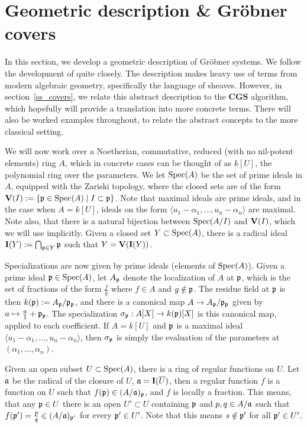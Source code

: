 \section{Geometric description \& Gröbner covers} \label{sec:grb_covers}
In this section, we develop a geometric description of Gröbner systems. We follow the development of \cite{grb_covers} quite closely. The description makes heavy use of terms from modern algebraic geometry, specifically the language of sheaves. However, in section~\ref{ss_covers}, we relate this abstract description to the $\mathbf{CGS}$ algorithm, which hopefully will provide a translation into more concrete terms. There will also be worked examples throughout, to relate the abstract concepts to the more classical setting.

We will now work over a Noetherian, commutative, reduced (with no nil-potent elements) ring $A$, which in concrete cases can be thought of as $k[U]$, the polynomial ring over the parameters. We let $\operatorname{Spec}(A)$ be the set of prime ideals in $A$, equipped with the Zariski topology, where the closed sets are of the form $\operatorname{\mathbf V}(I) := \{\mathfrak p \in \operatorname{Spec}(A) \mid I \subset \mathfrak p\}$. Note that maximal ideals are prime ideals, and in the case when $A = k[U]$, ideals on the form $\langle u_{1} - \alpha_{1}, \dots, u_{n} - \alpha_{n} \rangle$ are maximal. Note also, that there is a natural bijection between $\operatorname{Spec}(A/I)$ and $\operatorname{\mathbf V}(I)$, which we will use implicitly. Given a closed set $Y \subset \operatorname{Spec}(A)$, there is a radical ideal $\operatorname{\mathbf I}(Y) := \bigcap_{\mathfrak p \in Y} \mathfrak p$ such that $Y = \operatorname{\mathbf V}(\operatorname{\mathbf I}(Y))$.

Specializations are now given by prime ideals (elements of $\operatorname{Spec}(A)$). Given a prime ideal $\mathfrak p \in \operatorname{Spec}(A)$, let $A_{\mathfrak p}$ denote the localization of $A$ at $\mathfrak p$, which is the set of fractions of the form $\frac{f}{g}$ where $f \in A$ and $g \notin \mathfrak p$. The residue field at $\mathfrak p$ is then $k(\mathfrak p) := A_{\mathfrak p}/\mathfrak p_{\mathfrak p}$, and there is a canonical map $A \to A_{\mathfrak p}/\mathfrak p_{\mathfrak p}$ given by $a \mapsto \frac a 1 + \mathfrak p_{\mathfrak p}$. The specialization $\sigma_{\mathfrak p} : A[X] \to k(\mathfrak p)[X]$ is this canonical map, applied to each coefficient. If $A = k[U]$ and $\mathfrak p$ is a maximal ideal $\langle u_{1} - \alpha_{1}, \dots, u_{n} - \alpha_{n} \rangle$, then $\sigma_{\mathfrak p}$ is simply the evaluation of the parameters at $(\alpha_{1}, \dots, \alpha_{n})$.

Given an open subset $U \subset \operatorname{Spec}(A)$, there is a ring of regular functions on $U$. Let $\mathfrak{a}$ be the radical of the closure of $U$, $\mathfrak{a} = \operatorname{\mathbf I}(\overline U)$, then a regular function $f$ is a function on $U$ such that $f(\mathfrak p) \in (A/\mathfrak{a})_{\mathfrak p}$, and $f$ is locally a fraction. This means, that any $\mathfrak p \in U$ there is an open $U' \subset U$ containing $\mathfrak p$ and $p, q \in A/\mathfrak{a}$ such that $f(\mathfrak p') = \frac p q \in (A/\mathfrak{a})_{\mathfrak p'}$ for every $\mathfrak p' \in U'$. Note that this means $s \notin \mathfrak p'$ for all $\mathfrak p' \in U'$.

